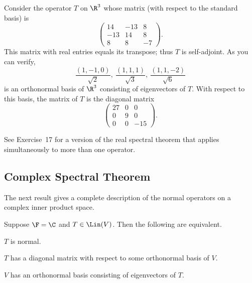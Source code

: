\begin{example}%
\label{ax:7.30}
Consider the operator $T$ on $\R^3$ whose matrix (with respect to the standard
basis) is
\[ \begin{pmatrix} 14 & -13 & 8\\ -13 & 14 & 8\\ 8 & 8 & -7 \end{pmatrix}. \]
This matrix with real entries equals its transpose; thus $T$ is self-adjoint.
As you can verify,
\[ \frac{(1,-1,0)}{\sqrt2},\ \frac{(1,1,1)}{\sqrt3},\ \frac{(1,1,-2)}{\sqrt6} \]
is an orthonormal basis of $\R^3$ consisting of eigenvectors of $T$. With
respect to this basis, the matrix of $T$ is the diagonal matrix
\[ \begin{pmatrix} 27 & 0 & 0\\ 0 & 9 & 0\\ 0 & 0 & -15 \end{pmatrix}. \]
\end{example}

See Exercise~17 for a version of the real spectral theorem that applies
simultaneously to more than one operator.

\subsection{Complex Spectral Theorem}

The next result gives a complete description of the normal operators on a
complex inner product space.

\begin{result}\label{ax:7.31}
Suppose $\F=\C$ and $T\in\Lin(V)$. Then the following are equivalent.
\begin{parts}
\item $T$ is normal.
\item $T$ has a diagonal matrix with respect to some orthonormal basis of $V$.
\item $V$ has an orthonormal basis consisting of eigenvectors of $T$.
\end{parts}
\end{result}

